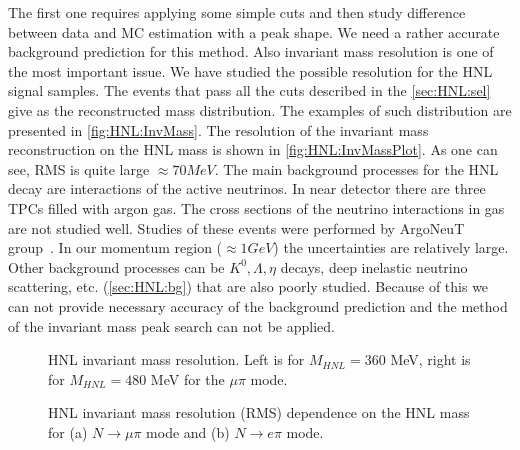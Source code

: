 \documentclass[../main.tex]{subfiles}
\begin{document}
The first one requires applying some simple cuts and then study difference between data and MC estimation with a peak shape. We need a rather accurate background prediction for this method. Also invariant mass resolution is one of the most important issue. We have studied the possible resolution for the HNL signal samples. The events that pass all the cuts described in the \autoref{sec:HNL:sel} give as the reconstructed mass distribution. The examples of such distribution are presented in \autoref{fig:HNL:InvMass}. The resolution of the invariant mass reconstruction on the HNL mass is shown in \autoref{fig:HNL:InvMassPlot}. As one can see, RMS is quite large $\approx70MeV$. The main background processes for the HNL decay are  interactions of the active neutrinos. In near detector there are three TPCs filled with argon gas. The cross sections of the neutrino interactions in gas are not studied well. Studies of these events were performed by ArgoNeuT group~\cite{Acciarri2014}. In our momentum region ($\approx1GeV$) the uncertainties are relatively large. Other background processes can be $K^0, \Lambda, \eta$ decays, deep inelastic neutrino scattering, etc. (\autoref{sec:HNL:bg}) that are also poorly studied. Because of this we can not provide necessary accuracy of the background prediction and the method of the invariant mass peak search can not be applied.
\begin{figure}[!ht]
    \begin{minipage}[!ht]{0.49\linewidth}
    \end{minipage}
    \hfill
    \begin{minipage}[!ht]{0.49\linewidth}
    \end{minipage}
    \caption{HNL invariant mass resolution. Left is for $M_{HNL}=360$ MeV, right is for $M_{HNL}=480$ MeV for the $\mu\pi$ mode.}
    \label{fig:HNL:InvMass}
\end{figure}

\begin{figure}[!ht]
    \begin{minipage}[!ht]{0.49\linewidth}
    \end{minipage}
    \hfill
    \begin{minipage}[!ht]{0.49\linewidth}
    \end{minipage}
    \caption{HNL invariant mass resolution (RMS) dependence on the HNL mass for (a) $N\to \mu\pi$ mode and (b) $N\to e\pi$ mode.}
    \label{fig:HNL:InvMassPlot}
\end{figure}
\end{document}
